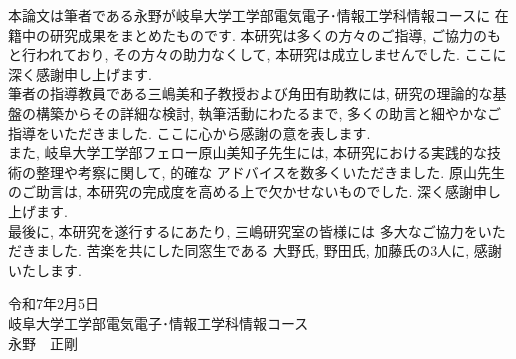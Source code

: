 本論文は筆者である永野が岐阜大学工学部電気電子･情報工学科情報コースに
在籍中の研究成果をまとめたものです. 本研究は多くの方々のご指導, 
ご協力のもと行われており, その方々の助力なくして, 
本研究は成立しませんでした. ここに深く感謝申し上げます. \\
\indent 筆者の指導教員である三嶋美和子教授および角田有助教には, 
研究の理論的な基盤の構築からその詳細な検討, 執筆活動にわたるまで, 
多くの助言と細やかなご指導をいただきました. 
ここに心から感謝の意を表します. \\
\indent また, 岐阜大学工学部フェロー原山美知子先生には, 
本研究における実践的な技術の整理や考察に関して, 的確な
アドバイスを数多くいただきました. 原山先生のご助言は, 
本研究の完成度を高める上で欠かせないものでした. 深く感謝申し上げます.\\ 
\indent 最後に, 本研究を遂行するにあたり, 三嶋研究室の皆様には
多大なご協力をいただきました. 苦楽を共にした同窓生である
大野氏, 野田氏, 加藤氏の3人に, 感謝いたします.\\[5em]

\begin{flushright}
  令和7年2月5日\\
  岐阜大学工学部電気電子･情報工学科情報コース\\
  永野　正剛
\end{flushright}
  